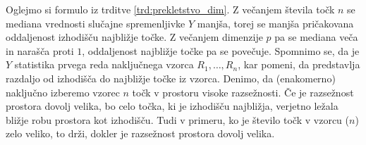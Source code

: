 \documentclass[12pt,a4paper,twoside]{article}
\theoremstyle{definition} %
\theoremstyle{plain} %
\numberwithin{equation}{section}  %
\begin{document}





Oglejmo si formulo iz trditve \ref{trd:prekletstvo_dim}.
Z večanjem števila točk $n$ se mediana vrednosti slučajne spremenljivke $Y$ manjša, torej se manjša pričakovana oddaljenost izhodišču najbližje točke.
Z večanjem dimenzije $p$ pa se mediana veča in narašča proti $1$, oddaljenost najbližje točke pa se povečuje.
Spomnimo se, da je $Y$ statistika prvega reda naključnega vzorca $R_1, \ldots, R_n$, kar pomeni, da predstavlja razdaljo od izhodišča do najbližje točke iz vzorca.
Denimo, da (enakomerno) naključno izberemo vzorec $n$ točk v prostoru visoke razsežnosti.
Če je razsežnost prostora dovolj velika, bo celo točka, ki je izhodišču najbližja, verjetno ležala bližje robu prostora kot izhodišču.
Tudi v primeru, ko je število točk v vzorcu ($n$) zelo veliko, to drži, dokler je razsežnost prostora dovolj velika.
\end{document}
